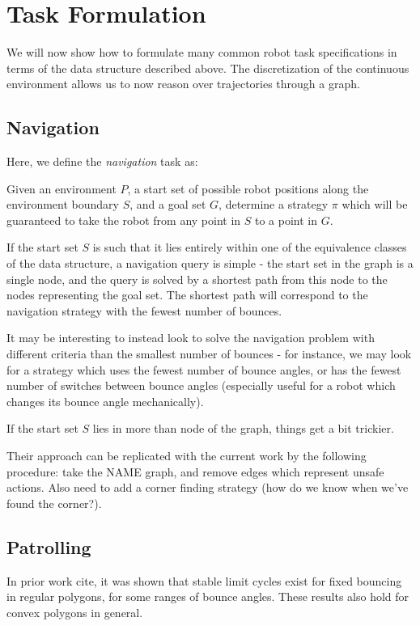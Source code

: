 \documentclass[letterpaper, 10 pt, conference]{ieeeconf}  %
\begin{document}
\section{Task Formulation}

We will now show how to formulate many common robot task specifications in terms
of the data structure described above. The discretization of the continuous
environment allows us to now reason over trajectories through a graph.


\subsection{Navigation}

Here, we define the \emph{navigation} task as:

Given an environment $P$, a start set of possible robot positions along the
environment boundary $S$, and a goal set $G$, determine a strategy $\pi$ which
will be guaranteed to take the robot from any point in $S$ to a point in $G$.

If the start set $S$ is such that it lies entirely within one of the equivalence
classes of the data structure, a navigation query is simple - the start set in
the graph is a single node, and the query is solved by a shortest path from this
node to the nodes representing the goal set. The shortest path will correspond
to the navigation strategy with the fewest number of bounces.

It may be
interesting to instead look to solve the navigation problem with different
criteria than the smallest number of bounces - for instance, we may look for a
strategy which uses the fewest number of bounce angles, or has the fewest number
of switches between bounce angles (especially useful for a robot which changes
its bounce angle mechanically).

If the start set $S$ lies in more than node of the graph, things get a bit
trickier.


Their approach can be replicated with the current work by the following
procedure: take the {\color{red}NAME} graph, and remove edges which represent unsafe actions.
Also need to add a corner finding strategy (how do we know when we've found the
corner?). 

\subsection{Patrolling}

In prior work {\color{red} cite}, it was shown that stable limit cycles exist for fixed bouncing in regular polygons, for some ranges of bounce angles. These results also hold for convex polygons in general.
\end{document}
